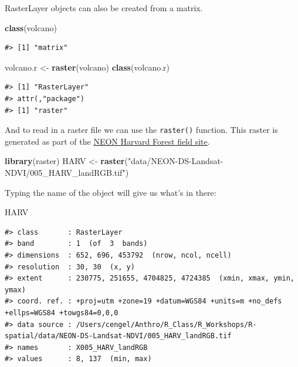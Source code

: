 \documentclass[]{book}
\newenvironment{Shaded}{\begin{snugshade}}{\end{snugshade}}
\newcommand{\KeywordTok}[1]{\textcolor[rgb]{0.13,0.29,0.53}{\textbf{#1}}}
\newcommand{\StringTok}[1]{\textcolor[rgb]{0.31,0.60,0.02}{#1}}
\newcommand{\NormalTok}[1]{#1}
\theoremstyle{definition}
\theoremstyle{definition}
\theoremstyle{definition}
\theoremstyle{remark}
\begin{document}
RasterLayer objects can also be created from a matrix.

\begin{Shaded}
\begin{Highlighting}[]
\KeywordTok{class}\NormalTok{(volcano)}
\end{Highlighting}
\end{Shaded}

\begin{verbatim}
#> [1] "matrix"
\end{verbatim}

\begin{Shaded}
\begin{Highlighting}[]
\NormalTok{volcano.r <-}\StringTok{ }\KeywordTok{raster}\NormalTok{(volcano)}
\KeywordTok{class}\NormalTok{(volcano.r)}
\end{Highlighting}
\end{Shaded}

\begin{verbatim}
#> [1] "RasterLayer"
#> attr(,"package")
#> [1] "raster"
\end{verbatim}

And to read in a raster file we can use the \texttt{raster()} function.
This raster is generated as part of the
\href{https://www.neonscience.org/field-sites/field-sites-map/HARV}{NEON
Harvard Forest field site}.

\begin{Shaded}
\begin{Highlighting}[]
\KeywordTok{library}\NormalTok{(raster)}
\NormalTok{HARV <-}\StringTok{ }\KeywordTok{raster}\NormalTok{(}\StringTok{"data/NEON-DS-Landsat-NDVI/005_HARV_landRGB.tif"}\NormalTok{)}
\end{Highlighting}
\end{Shaded}

Typing the name of the object will give us what's in there:

\begin{Shaded}
\begin{Highlighting}[]
\NormalTok{HARV}
\end{Highlighting}
\end{Shaded}

\begin{verbatim}
#> class       : RasterLayer 
#> band        : 1  (of  3  bands)
#> dimensions  : 652, 696, 453792  (nrow, ncol, ncell)
#> resolution  : 30, 30  (x, y)
#> extent      : 230775, 251655, 4704825, 4724385  (xmin, xmax, ymin, ymax)
#> coord. ref. : +proj=utm +zone=19 +datum=WGS84 +units=m +no_defs +ellps=WGS84 +towgs84=0,0,0 
#> data source : /Users/cengel/Anthro/R_Class/R_Workshops/R-spatial/data/NEON-DS-Landsat-NDVI/005_HARV_landRGB.tif 
#> names       : X005_HARV_landRGB 
#> values      : 8, 137  (min, max)
\end{verbatim}
\end{document}

